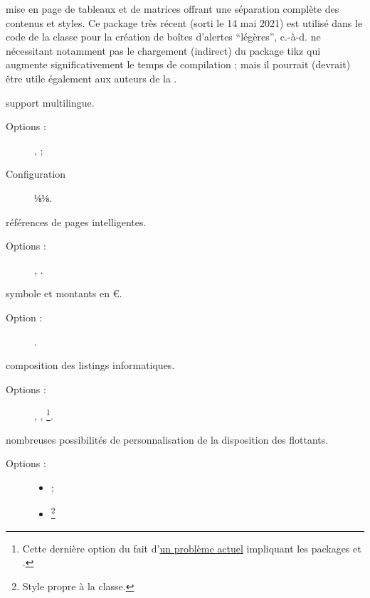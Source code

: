 \documentclass{letgut}
\begin{document}
\begin{ctannews}
\item[tabularray] mise en page de tableaux et de matrices offrant une séparation
  complète des contenus et styles. Ce package très récent (sorti le 14 mai 2021)
  est utilisé dans le code de la classe pour la création de boîtes d'alertes
  \enquote{légères}, c.-à-d. ne nécessitant notamment pas le chargement
  (indirect) du package \ac{tikz} qui augmente significativement le temps de
  compilation ; mais il pourrait (devrait) être utile également aux auteurs de
  la .
\item[babel] support multilingue.
  \begin{description}
  \item[Options :] ,  ;
  \item[Configuration] ⅛\renewcommand*\frenchtablename{Tableau}⅛.
  \end{description}
\item[varioref] références de pages intelligentes.
  \begin{description}
  \item[Options :] , .
  \end{description}
\item[eurosym] symbole et montants en \euro{}.
  \begin{description}
  \item[Option :] .
  \end{description}
\item[listings] composition des listings informatiques.
  \begin{description}
  \item[Options :] , ,
    \footnote{Cette dernière option du fait
      d'\href{https://github.com/FrankMittelbach/fmitex-parskip/issues/3}{un
        problème actuel} impliquant les packages  et
      .}.
  \end{description}
\item[floatrow] nombreuses possibilités de personnalisation de la disposition
  des flottants.
  \begin{description}
  \item[Options :]\leavevmode{}
    \begin{itemize}
    \item {} ;
    \item {}\footnote{Style propre à la classe.}

\end{itemize}
\end{description}
\end{ctannews}
\end{document}

